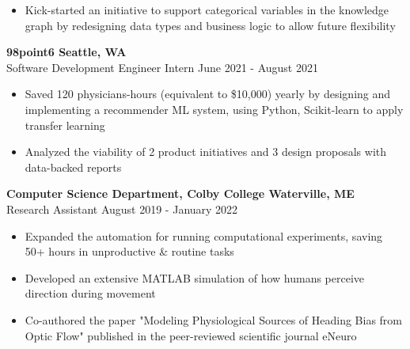 \documentclass[letterpaper]{article}
\newcommand{\expheader}[4]{
    \vspace{2mm}
    \textbf{#1 \hfill #2}\\
    #3 \hfill #4\\
    \vspace{-2mm}
}
\begin{document}
\begin{itemize}
	\item Kick-started an initiative to support categorical variables in the knowledge graph by redesigning data types and business logic to allow future flexibility
    
\end{itemize}

\expheader{98point6}{Seattle, WA}{Software Development Engineer Intern}{June
2021 - August 2021}
\begin{itemize} \itemsep 0pt
    \item Saved 120 physicians-hours (equivalent to \$10,000) yearly by designing and implementing a recommender ML system, using Python, Scikit-learn to apply transfer learning
	\item Analyzed the viability of 2 product initiatives and 3 design proposals with data-backed reports
\end{itemize}

\expheader{Computer Science Department, Colby College}{Waterville, ME}{Research Assistant}{August 2019 - January 2022}
\begin{itemize} \itemsep 0pt
	\item Expanded the automation for running computational experiments, saving 50+ hours in unproductive \& routine tasks
     \item Developed an extensive MATLAB simulation of how humans perceive direction during movement
	\item Co-authored the paper "Modeling Physiological Sources of Heading Bias from Optic Flow" published in the peer-reviewed scientific journal eNeuro
\end{itemize}


\end{document}
